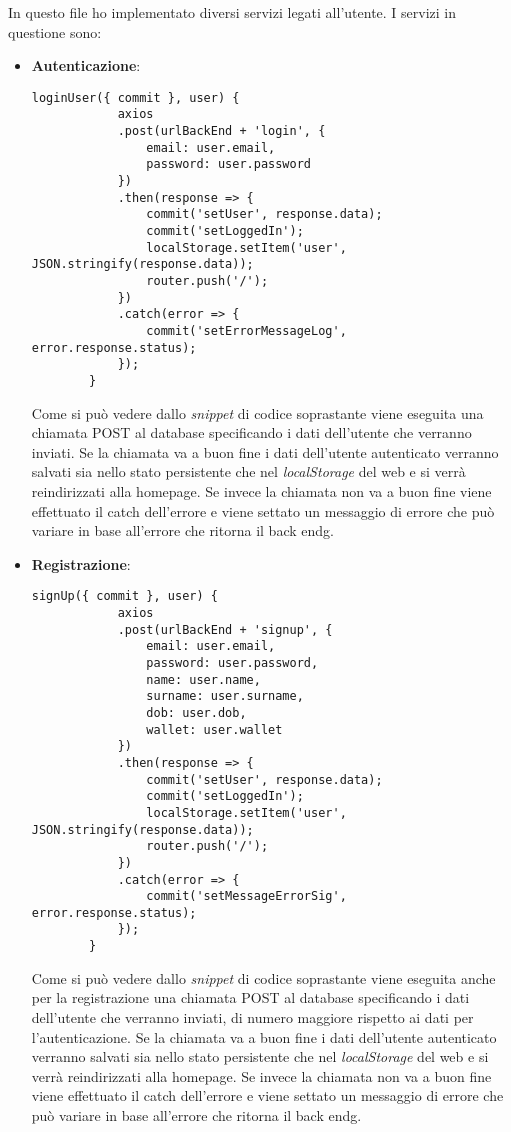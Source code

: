 In questo file ho implementato diversi servizi legati all'utente. I servizi in questione sono:
\begin{itemize}
	\item \textbf{Autenticazione}:
	\begin{lstlisting}[caption=Autententicazione., label=lst::autenticazione]
		loginUser({ commit }, user) {
			axios
			.post(urlBackEnd + 'login', {
				email: user.email,
				password: user.password
			})
			.then(response => {
				commit('setUser', response.data);
				commit('setLoggedIn');
				localStorage.setItem('user', JSON.stringify(response.data));
				router.push('/');
			})
			.catch(error => {
				commit('setErrorMessageLog', error.response.status);
			});
		}
	\end{lstlisting}
	Come si può vedere dallo \textit{snippet} di codice soprastante viene eseguita una chiamata POST al database specificando i dati dell'utente che verranno inviati. Se la chiamata va a buon fine i dati dell'utente autenticato verranno salvati sia nello stato persistente che nel \textit{localStorage} del web e si verrà reindirizzati alla homepage. Se invece la chiamata non va a buon fine viene effettuato il catch dell'errore e viene settato un messaggio di errore che può variare in base all'errore che ritorna il \gls{back endg}.
	\item \textbf{Registrazione}:
	\begin{lstlisting}[caption=Registrazione., label=lst::registrazione]
		signUp({ commit }, user) {
			axios
			.post(urlBackEnd + 'signup', {
				email: user.email,
				password: user.password,
				name: user.name,
				surname: user.surname,
				dob: user.dob,
				wallet: user.wallet
			})
			.then(response => {
				commit('setUser', response.data);
				commit('setLoggedIn');
				localStorage.setItem('user', JSON.stringify(response.data));
				router.push('/');
			})
			.catch(error => {
				commit('setMessageErrorSig', error.response.status);
			});
		}
	\end{lstlisting}
	Come si può vedere dallo \textit{snippet} di codice soprastante viene eseguita anche per la registrazione una chiamata POST al database specificando i dati dell'utente che verranno inviati, di numero maggiore rispetto ai dati per l'autenticazione. Se la chiamata va a buon fine i dati dell'utente autenticato verranno salvati sia nello stato persistente che nel \textit{localStorage} del web e si verrà reindirizzati alla homepage. Se invece la chiamata non va a buon fine viene effettuato il catch dell'errore e viene settato un messaggio di errore che può variare in base all'errore che ritorna il \gls{back endg}.

\end{itemize}
